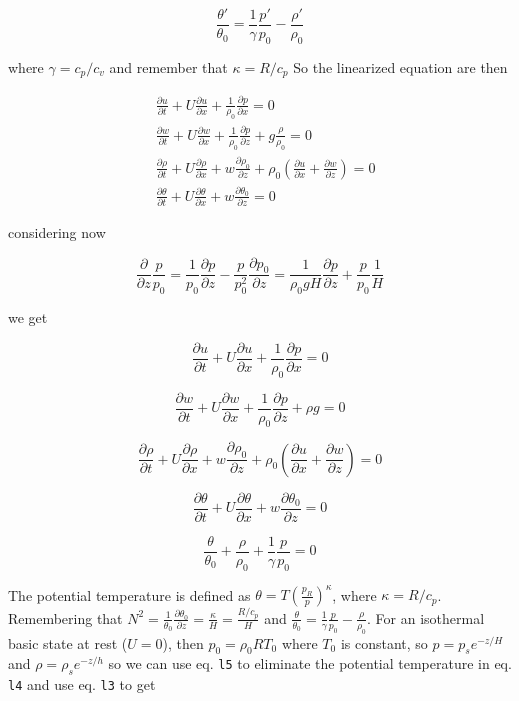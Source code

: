 \[\frac{\theta'}{\theta_0} = \frac{1}{\gamma}\frac{p'}{p_0} - \frac{\rho'}{\rho_0}\]

where \(\gamma = c_p/c_v\) and remember that \(\kappa = R/c_p\) So the
linearized equation are then

\[\begin{aligned}
&\frac{\partial u}{\partial t} + U\frac{\partial u}{\partial x} + \frac{1}{\rho_0}\frac{\partial p}{\partial x} = 0\\
&\frac{\partial w}{\partial t} + U\frac{\partial w}{\partial x} + \frac{1}{\rho_0}\frac{\partial p}{\partial z}+g\frac{\rho}{\rho_0} = 0\\
&\frac{\partial \rho}{\partial t} + U\frac{\partial \rho}{\partial x}+ w \frac{\partial \rho_0}{\partial z} +\rho_0 (\frac{\partial u}{\partial x} +\frac{\partial w}{\partial z})= 0\\
&\frac{\partial \theta}{\partial t}+ U\frac{\partial \theta}{\partial x} + w \frac{\partial \theta_0}{\partial z}= 0
\end{aligned}\]

considering now

\[\frac{\partial }{\partial z}\frac{p}{p_0} = \frac{1}{p_0}\frac{\partial p}{\partial z} - \frac{p}{p_0^2}\frac{\partial p_0}{\partial z}
= \frac{1}{\rho_0 g H}\frac{\partial p}{\partial z} + \frac{p}{p_0}\frac{1}{H}\]

we get

{\[\frac{\partial u}{\partial t} + U\frac{\partial u}{\partial x} + \frac{1}{\rho_0}\frac{\partial p}{\partial x} = 0\]}

{\[\frac{\partial w}{\partial t} + U\frac{\partial w}{\partial x} +  \frac{1}{\rho_0}\frac{\partial p}{\partial z}  +\rho g= 0\]}

{\[\frac{\partial \rho}{\partial t} + U\frac{\partial \rho}{\partial x} +w \frac{\partial \rho_0}{\partial z}+ \rho_0 (\frac{\partial u}{\partial x} +\frac{\partial w}{\partial z})= 0\]}

{\[\frac{\partial \theta}{\partial t} + U\frac{\partial \theta}{\partial x}+ w \frac{\partial \theta_0}{\partial z}= 0\]}

{\[\frac{\theta}{\theta_0} +\frac{\rho}{\rho_0} + \frac{1}{\gamma}\frac{p}{p_0} = 0\]}

The potential temperature is defined as
\(\theta = T\left(\frac{p_R}{p}\right)^{\kappa}\), where
\(\kappa=R/c_p\). Remembering that
\(N^2 = \frac{1}{\theta_0}\frac{\partial \theta_0}{\partial z} = \frac{\kappa}{H} = \frac{R/c_p}{H}\)
and
\(\frac{\theta}{\theta_0} = \frac{1}{\gamma}\frac{p}{p_0} -\frac{\rho}{\rho_0}\).
For an isothermal basic state at rest (\(U=0\)), then
\(p_0 =\rho_0 R T_0\) where \(T_0\) is constant, so \(p = p_s e^{-z/H}\)
and \(\rho = \rho_s e^{-z/h}\) so we can use eq. \texttt{l5} to
eliminate the potential temperature in eq. \texttt{l4} and use eq.
\texttt{l3} to get

